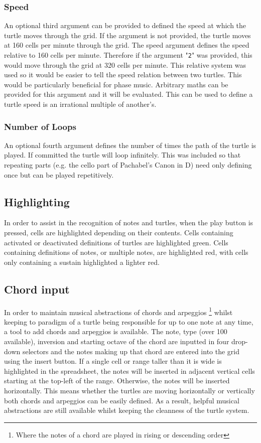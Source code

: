 \subsubsection{Speed}

An optional third argument can be provided to defined the speed at which the turtle moves through the grid. If the argument is not provided, the turtle moves at 160 cells per minute through the grid. The speed argument defines the speed relative to 160 cells per minute. Therefore if the argument "\texttt{2}" was provided, this would move through the grid at 320 cells per minute. This relative system was used so it would be easier to tell the speed relation between two turtles. This would be particularly beneficial for phase music. Arbitrary maths can be provided for this argument and it will be evaluated. This can be used to define a turtle  speed is an irrational multiple of another's.

\subsubsection{Number of Loops}

An optional fourth argument defines the number of times the path of the turtle is played. If committed the turtle will loop infinitely. This was included so that repeating parts (e.g. the cello part of Pachabel's Canon in D) need only defining once but can be played repetitively.

\subsection{Highlighting}

In order to assist in the recognition of notes and turtles, when the play button is pressed, cells are highlighted depending on their contents. Cells containing activated or deactivated definitions of turtles are highlighted green. Cells containing definitions of notes, or multiple notes, are highlighted red, with cells only containing a sustain highlighted a lighter red.

\subsection{Chord input}

In order to maintain musical abstractions of chords and arpeggios \footnote{Where the notes of a chord are played in rising or descending order} whilst keeping to paradigm of a turtle being responsible for up to one note at any time, a tool to add chords and arpeggios is available. The note, type (over 100 available), inversion and starting octave of the chord are inputted in four drop-down selectors and the notes making up that chord are entered into the grid using the insert button. If a single cell or range taller than it is wide is highlighted in the spreadsheet, the notes will be inserted in adjacent vertical cells starting at the top-left of the range. Otherwise, the notes will be inserted horizontally. This means whether the turtles are moving horizontally or vertically both chords and arpeggios can be easily defined. As a result, helpful musical abstractions are still available whilst keeping the cleanness of the turtle system.

